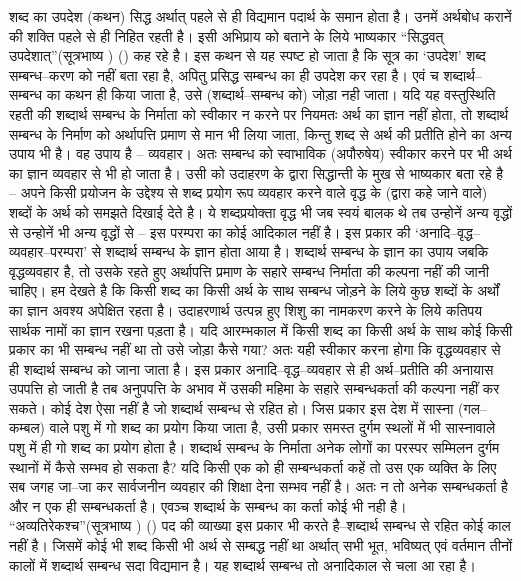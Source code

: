 शब्द का उपदेश (कथन) सिद्ध अर्थात् पहले से ही विद्यमान पदार्थ के समान होता है। उनमें अर्थबोध करानें की शक्ति पहले से ही निहित रहती है। इसी अभिप्राय को बताने के लिये भाष्यकार “सिद्धवत् उपदेशात्”(सूत्रभाष्य ) () कह रहे है। इस कथन से यह स्पष्ट हो जाता है कि सूत्र का ‘उपदेश' शब्द सम्बन्ध–करण को नहीं बता रहा है, अपितु प्रसिद्ध सम्बन्ध का ही उपदेश कर रहा है। एवं च शब्दार्थ–सम्बन्ध का कथन ही किया जाता है, उसे (शब्दार्थ–सम्बन्ध को) जोड़ा नही जाता। यदि यह वस्तुस्थिति रहती की शब्दार्थ सम्बन्ध के निर्माता को स्वीकार न करने पर नियमतः अर्थ का ज्ञान नहीं होता, तो शब्दार्थ सम्बन्ध के निर्माण को अर्थापत्ति प्रमाण से मान भी लिया जाता, किन्तु शब्द से अर्थ की प्रतीति होने का अन्य उपाय भी है। वह उपाय है – व्यवहार। अतः सम्बन्ध को स्वाभाविक (अपौरुषेय) स्वीकार करने पर भी अर्थ का ज्ञान व्यवहार से भी हो जाता है। उसी को उदाहरण के द्वारा सिद्धान्ती के मुख से भाष्यकार बता रहे है – अपने किसी प्रयोजन के उद्देश्य से शब्द प्रयोग रूप व्यवहार करने वाले वृद्ध के (द्वारा कहे जाने वाले) शब्दों के अर्थ को समझते दिखाई देते है। ये शब्दप्रयोक्ता वृद्ध भी जब स्वयं बालक थे तब उन्होनें अन्य वृद्धों से उन्होनें भी अन्य वृद्धों से – इस परम्परा का कोई आदिकाल नहीं है। इस प्रकार की ‘अनादि–वृद्ध–व्यवहार–परम्परा' से शब्दार्थ सम्बन्ध के ज्ञान होता आया है। शब्दार्थ सम्बन्ध के ज्ञान का उपाय जबकि वृद्धव्यवहार है, तो उसके रहते हुए अर्थापत्ति प्रमाण के सहारे सम्बन्ध निर्माता की कल्पना नहीं की जानी चाहिए। हम देखते है कि किसी शब्द का किसी अर्थ के साथ सम्बन्ध जोड़ने के लिये कुछ शब्दों के अर्थों का ज्ञान अवश्य अपेक्षित रहता है। उदाहरणार्थ उत्पन्न हुए शिशु का नामकरण करने के लिये कतिपय सार्थक नामों का ज्ञान रखना पड़ता है। यदि आरम्भकाल में किसी शब्द का किसी अर्थ के साथ कोई किसी प्रकार का भी सम्बन्ध नहीं था तो उसे जोड़ा कैसे गया? अतः यही स्वीकार करना होगा कि वृद्धव्यवहार से ही शब्दार्थ सम्बन्ध को जाना जाता है। इस प्रकार अनादि–वृद्ध–व्यवहार से ही अर्थ–प्रतीति की अनायास उपपत्ति हो जाती है तब अनुपपत्ति के अभाव में उसकी महिमा के सहारे सम्बन्धकर्ता की कल्पना नहीं कर सकते। कोई देश ऐसा नहीं है जो शब्दार्थ सम्बन्ध से रहित हो। जिस प्रकार इस देश में सास्ना (गल–कम्बल) वाले पशु में गो शब्द का प्रयोग किया जाता है, उसी प्रकार समस्त दुर्गम स्थलों में भी सास्नावाले पशु में ही गो शब्द का प्रयोग होता है। शब्दार्थ सम्बन्ध के निर्माता अनेक लोगों का परस्पर सम्मिलन दुर्गम स्थानों में कैसे सम्भव हो सकता है? यदि किसी एक को ही सम्बन्धकर्ता कहें तो उस एक व्यक्ति के लिए सब जगह जा–जा कर सार्वजनीन व्यवहार की शिक्षा देना सम्भव नहीं है। अतः न तो अनेक सम्बन्धकर्ता है और न एक ही सम्बन्धकर्ता है। एवञ्च शब्दार्थ के सम्बन्ध का कर्ता कोई भी नही है। “अव्यतिरेकश्च”(सूत्रभाष्य ) () पद की व्याख्या इस प्रकार भी करते है–शब्दार्थ सम्बन्ध से रहित कोई काल नहीं है। जिसमें कोई भी शब्द किसी भी अर्थ से सम्बद्ध नहीं था अर्थात् सभी भूत, भविष्यत् एवं वर्तमान तीनों कालों में शब्दार्थ सम्बन्ध सदा विद्यमान है। यह शब्दार्थ सम्बन्ध तो अनादिकाल से चला आ रहा है।

